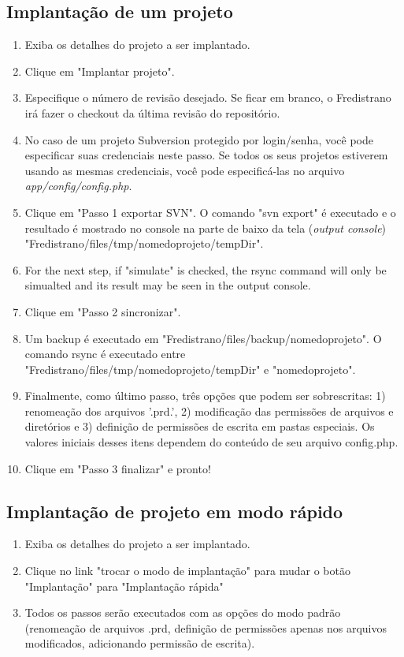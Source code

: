 \documentclass[12pt,a4paper]{report}
\begin{document}
\subsection{Implantação de um projeto}
\begin{enumerate}
\item Exiba os detalhes do projeto a ser implantado.
\item Clique em "Implantar projeto".
\item Especifique o número de revisão desejado.  Se ficar em branco, o Fredistrano irá fazer o checkout da última revisão do repositório.
\item No caso de um projeto Subversion protegido por login/senha, você pode especificar suas credenciais neste passo.  Se todos os seus projetos estiverem usando as mesmas credenciais, você pode especificá-las no arquivo \textit{app/config/config.php}.
\item Clique em "Passo 1 exportar SVN".  O comando "svn export" é executado e o resultado é mostrado no console na parte de baixo da tela (\textit{output console}) "Fredistrano/files/tmp/nomedoprojeto/tempDir".
\item For the next step, if "simulate" is checked, the rsync command will only be simualted and its  result may be seen in the output console.
\item Clique em "Passo 2 sincronizar".
\item Um backup é executado em "Fredistrano/files/backup/nomedoprojeto".  O comando rsync é executado entre "Fredistrano/files/tmp/nomedoprojeto/tempDir" e "nomedoprojeto".
\item Finalmente, como último passo, três opções que podem ser sobrescritas: 1) renomeação dos arquivos '.prd.', 2) modificação das permissões de arquivos e diretórios e 3) definição de permissões de escrita em pastas especiais.  Os valores iniciais desses itens dependem do conteúdo de seu arquivo config.php.
\item Clique em "Passo 3 finalizar" e pronto!
\end{enumerate}

\subsection{Implantação de projeto em modo rápido}
\begin{enumerate}
\item Exiba os detalhes do projeto a ser implantado.
\item Clique no link "trocar o modo de implantação" para mudar o botão "Implantação" para "Implantação rápida"
\item Todos os passos serão executados com as opções do modo padrão (renomeação de arquivos .prd, definição de permissões apenas nos arquivos modificados, adicionando permissão de escrita). 
\end{enumerate}
\end{document}

